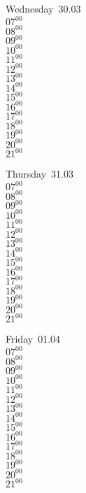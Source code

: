 \documentclass[11pt,a4paper]{book}\usepackage[]{graphicx}\usepackage[]{color}
\begin{document}
\begin{weekdaybox}
  Wednesday~30.03\\
  { 
  \vfill
  $07^{00}$\\
$08^{00}$\\
$09^{00}$\\
$10^{00}$\\
$11^{00}$\\
$12^{00}$\\
$13^{00}$\\
$14^{00}$\\
$15^{00}$\\
$16^{00}$\\
$17^{00}$\\
$18^{00}$\\
$19^{00}$\\
$20^{00}$\\
$21^{00}$\\
  }
\end{weekdaybox}
\clearpage
\begin{headerbox}
\end{headerbox}
\begin{weekdaybox}
  Thursday~31.03\\
  { 
  \vfill
  $07^{00}$\\
$08^{00}$\\
$09^{00}$\\
$10^{00}$\\
$11^{00}$\\
$12^{00}$\\
$13^{00}$\\
$14^{00}$\\
$15^{00}$\\
$16^{00}$\\
$17^{00}$\\
$18^{00}$\\
$19^{00}$\\
$20^{00}$\\
$21^{00}$\\
  }
\end{weekdaybox} 
\begin{weekdaybox}
  Friday~01.04\\
  { 
  \vfill
  $07^{00}$\\
$08^{00}$\\
$09^{00}$\\
$10^{00}$\\
$11^{00}$\\
$12^{00}$\\
$13^{00}$\\
$14^{00}$\\
$15^{00}$\\
$16^{00}$\\
$17^{00}$\\
$18^{00}$\\
$19^{00}$\\
$20^{00}$\\
$21^{00}$\\
  }
\end{weekdaybox}
\end{document}
